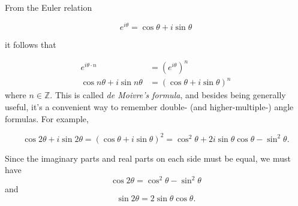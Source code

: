 \documentclass[12pt]{article}
\begin{document}
From the Euler relation

\begin{equation*}
e^{i\theta} = \cos \theta + i \sin \theta
\end{equation*}

it follows that

\begin{align*}
e^{i\theta \cdot n} &= (e^{i\theta})^n\\
\cos n \theta + i \sin n \theta &= (\cos \theta + i \sin \theta)^n
\end{align*}
where $n\in\mathbb{Z}$.
This is called \emph{de Moivre's formula}, and besides being generally useful, it's a convenient way to remember double- (and higher-multiple-) angle formulas.  For example,

\begin{equation*}
\cos 2 \theta + i \sin 2 \theta = (\cos \theta + i \sin \theta)^2 = \cos^2 \theta + 2 i \sin \theta \cos \theta - \sin^2 \theta.
\end{equation*}

Since the imaginary parts and real parts on each side must be equal, we must have
\begin{equation*}
\cos 2 \theta = \cos^2 \theta - \sin^2 \theta
\end{equation*}
and
\begin{equation*}
\sin 2 \theta = 2 \sin \theta \cos \theta.
\end{equation*}
\end{document}
